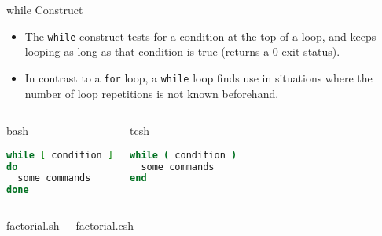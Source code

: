 \documentclass[10pt,t]{beamer}
\begin{document}
\begin{frame}[fragile]{while Construct}
  \begin{itemize}
  \item The \texttt{while} construct tests for a condition at the top of a loop, and keeps looping as long as that condition is true (returns a 0 exit status). 
  \item In contrast to a \texttt{for} loop, a \texttt{while} loop finds use in situations where the number of loop repetitions is not known beforehand.
  \end{itemize}
  \vspace{-0.5cm}
  \begin{columns}
    \begin{exampleblock}{bash}
      \begin{lstlisting}[language=bash]
while [ condition ]
do
  some commands
done
      \end{lstlisting}
    \end{exampleblock}
    \begin{block}{tcsh}
      \begin{lstlisting}[language=csh]
while ( condition )
  some commands
end
      \end{lstlisting}
    \end{block}
  \end{columns}
  \begin{columns}
    \vspace{-0.2cm}
    \begin{exampleblock}{factorial.sh}
      
    \end{exampleblock}
    \vspace{-0.2cm}
    \begin{block}{factorial.csh}
      
    \end{block}
  \end{columns}
\end{frame}
\end{document}
